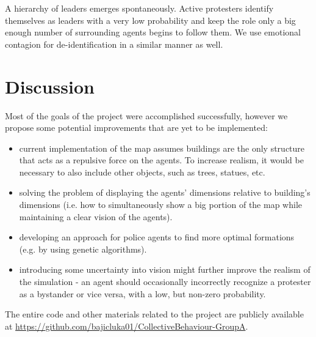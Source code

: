 \documentclass[9pt]{pnas-new}
\begin{document}
A hierarchy of leaders emerges spontaneously. Active protesters identify themselves as leaders with a very low probability and keep the role only a big enough number of surrounding agents begins to follow them. We use emotional contagion for de-identification in a similar manner as well. 

\section*{Discussion}

Most of the goals of the project were accomplished successfully, however we propose some potential improvements that are yet to be implemented: 
\begin{itemize}
\item current implementation of the map assumes buildings are the only structure that acts as a repulsive force on the agents. To increase realism, it would be necessary to also include other objects, such as trees, statues, etc.
\item solving the problem of displaying the agents' dimensions relative to building's dimensions (i.e. how to simultaneously show a big portion of the map while maintaining a clear vision of the agents).
\item developing an approach for police agents to find more optimal formations (e.g. by using genetic algorithms). 
\item introducing some uncertainty into vision might further improve the realism of the simulation - an agent should occasionally incorrectly recognize a protester as a bystander or vice versa, with a low, but non-zero probability. 
\end{itemize}

The entire code and other materials related to the project are publicly available at \url{https://github.com/bajicluka01/CollectiveBehaviour-GroupA}.

\showacknow %


\begin{multicols}{2}
\section*{\bibname}

\end{multicols}
\end{document}
